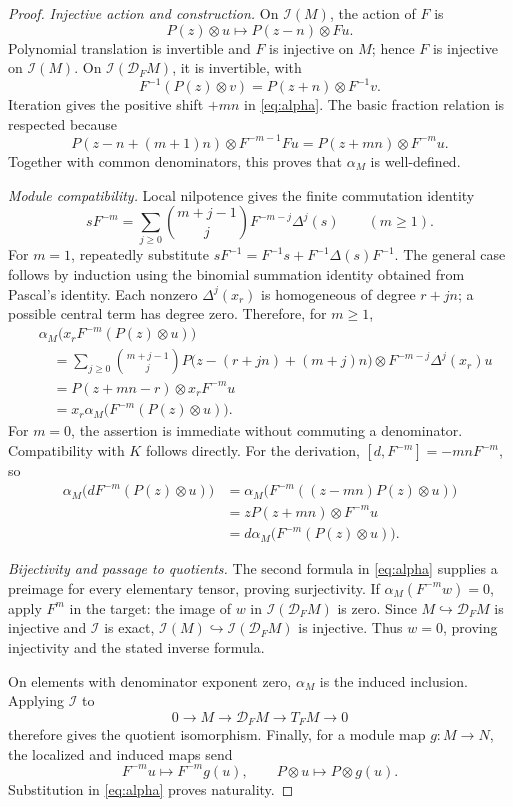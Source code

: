 \documentclass[11pt]{article}
\newcommand{\I}{\mathcal I}
\newcommand{\D}{\mathcal D}
\theoremstyle{definition}
\begin{document}
\begin{proof}
\emph{Injective action and construction.}
On \(\I(M)\), the action of \(F\) is
\[
 P(z)\otimes u\longmapsto P(z-n)\otimes Fu.
\]
Polynomial translation is invertible and \(F\) is injective on \(M\);
hence \(F\) is injective on \(\I(M)\). On \(\I(\D_FM)\), it is
invertible, with
\[
 F^{-1}(P(z)\otimes v)=P(z+n)\otimes F^{-1}v.
\]
Iteration gives the positive shift \(+mn\) in \eqref{eq:alpha}.
The basic fraction relation is respected because
\[
 P(z-n+(m+1)n)\otimes F^{-m-1}Fu
 =P(z+mn)\otimes F^{-m}u.
\]
Together with common denominators, this proves that \(\alpha_M\)
is well-defined.

\emph{Module compatibility.}
Local nilpotence gives the finite commutation identity
\begin{equation}\label{eq:finite-commutation}
 sF^{-m}
 =\sum_{j\ge0}\binom{m+j-1}{j}F^{-m-j}\Delta^j(s)
 \qquad(m\ge1).
\end{equation}
For \(m=1\), repeatedly substitute
\(sF^{-1}=F^{-1}s+F^{-1}\Delta(s)F^{-1}\).
The general case follows by induction using the binomial summation
identity obtained from Pascal's identity. Each nonzero
\(\Delta^j(x_r)\) is homogeneous of degree \(r+jn\); a possible
central term has degree zero. Therefore, for \(m\ge1\),
\begin{align*}
 &\alpha_M\bigl(x_rF^{-m}(P(z)\otimes u)\bigr)\\
 &\quad=\sum_{j\ge0}\binom{m+j-1}{j}
 P\bigl(z-(r+jn)+(m+j)n\bigr)
       \otimes F^{-m-j}\Delta^j(x_r)u\\
 &\quad=P(z+mn-r)\otimes x_rF^{-m}u\\
 &\quad=x_r\alpha_M\bigl(F^{-m}(P(z)\otimes u)\bigr).
\end{align*}
For \(m=0\), the assertion is immediate without commuting a
denominator. Compatibility with \(K\) follows directly. For the
derivation, \([d,F^{-m}]=-mnF^{-m}\), so
\begin{align*}
 \alpha_M\bigl(dF^{-m}(P(z)\otimes u)\bigr)
 &=\alpha_M\bigl(F^{-m}((z-mn)P(z)\otimes u)\bigr)\\
 &=zP(z+mn)\otimes F^{-m}u\\
 &=d\alpha_M\bigl(F^{-m}(P(z)\otimes u)\bigr).
\end{align*}

\emph{Bijectivity and passage to quotients.}
The second formula in \eqref{eq:alpha} supplies a preimage for every
elementary tensor, proving surjectivity. If
\(\alpha_M(F^{-m}w)=0\), apply \(F^m\) in the target: the image of
\(w\) in \(\I(\D_FM)\) is zero. Since \(M\hookrightarrow\D_FM\)
is injective and \(\I\) is exact,
\(\I(M)\hookrightarrow\I(\D_FM)\) is injective. Thus \(w=0\),
proving injectivity and the stated inverse formula.

On elements with denominator exponent zero, \(\alpha_M\) is the
induced inclusion. Applying \(\I\) to
\[
 0\longrightarrow M\longrightarrow\D_FM
 \longrightarrow T_FM\longrightarrow0
\]
therefore gives the quotient isomorphism. Finally, for a module map
\(g:M\to N\), the localized and induced maps send
\[
 F^{-m}u\longmapsto F^{-m}g(u),\qquad
 P\otimes u\longmapsto P\otimes g(u).
\]
Substitution in \eqref{eq:alpha} proves naturality.
\end{proof}
\end{document}
